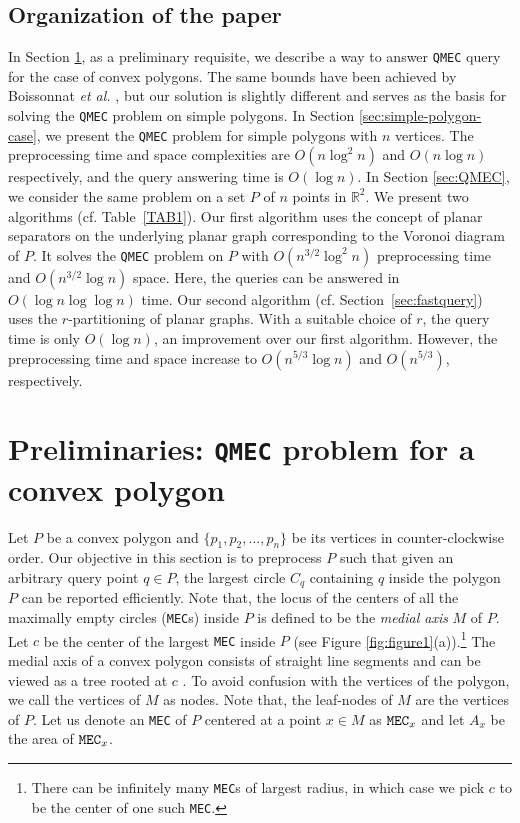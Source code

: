 \documentclass[12pt]{llncs}
\begin{document}
\subsection{Organization of the paper}
In Section \ref{sec:Convex}, as a preliminary requisite, we describe a way to answer {\tt QMEC} query for the case of convex polygons. The same bounds have been achieved by  Boissonnat {\it et al.} 
\cite{BCOY01}, but
our solution is slightly different and serves as the basis for solving the {\tt QMEC} problem on simple 
polygons. In Section \ref{sec:simple-polygon-case}, 
we present the {\tt QMEC} problem for simple polygons with $n$ vertices. The preprocessing 
time and space complexities are $O(n\log^2n)$ and $O(n\log n)$ respectively, 
and the query answering time is $O(\log n)$. In Section \ref{sec:QMEC}, we 
consider the same problem on  a set $P$ of $n$ points in $\mathbb{R}^2$. We present 
two algorithms (cf. Table\ \ref{TAB1}). Our first algorithm uses the 
concept of planar separators \cite{LT79} on the underlying planar graph corresponding to 
the  Voronoi  diagram of  $P$. It solves the {\tt QMEC} 
problem  on $P$ with $O(n^{3/2} \log^2 n)$ preprocessing time 
and $O(n^{3/2} \log n)$ space. Here, the queries can be answered in $O(\log n 
\log\log n)$ time. Our second algorithm (cf. Section\ \ref{sec:fastquery}) uses the $r$-partitioning \cite{fed} of planar graphs. With a suitable 
choice of
$r$, the query time is only $O(\log n)$, an improvement over our first algorithm. However, the preprocessing time 
and 
space increase
to $O(n^{5/3}\log n)$  and $O(n^{5/3})$, respectively. 

\section{Preliminaries: {\tt QMEC} problem for a convex polygon}
 \label{sec:Convex}


Let $P$ be a convex polygon and $\{p_1, p_2, \ldots, p_n\}$ be its
vertices in counter-clockwise order. Our objective in this section is to preprocess
$P$ such that given an arbitrary query point $q \in P$, the largest
circle $C_q$ containing $q$ inside the polygon $P$ can be reported 
efficiently. Note that, the locus of the centers of all the maximally empty circles ({\tt MEC}s) 
inside $P$ is defined to be the {\em medial axis} $M$ of $P$. Let $c$ be the center of 
the largest {\tt MEC} inside $P$ (see Figure \ref{fig:figure1}(a)).\footnote{There can be 
infinitely many {\tt MEC}s of largest radius, in which case we pick 
$c$ to be the center of one such {\tt MEC}.} The medial 
axis of a convex polygon consists of straight line
segments and can be viewed as a tree rooted at $c$ \cite{CSW99}. To
avoid  confusion with the vertices of the polygon, we call the
vertices of $M$ as nodes. Note that, the leaf-nodes of $M$ are the
vertices of $P$. Let us denote an {\tt MEC}  of $P$ centered at a point $x
\in M$ as ${\tt MEC}_x$ and let $A_x$ be the area of ${\tt MEC}_x$. 
\end{document}
